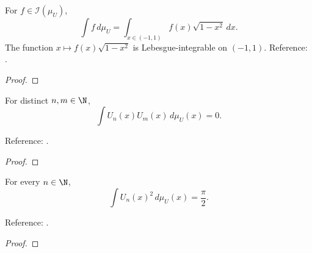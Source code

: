 \begin{lemma}
\label{lem:U-integral}
\leanok
For $f\in\mathcal I(\mu_U)$,
\[\int f\,d\mu_U=\int_{x\in(-1,1)} f(x)\sqrt{1-x^2}\,dx.\]
The function $x\mapsto f(x)\sqrt{1-x^2}$ is Lebesgue-integrable on $(-1,1)$.
Reference: \cite[Table 18.3.1]{dlmf}.
\end{lemma}
\begin{proof}
\leanok
\end{proof}

\begin{theorem}
\label{thm:U-orthogonal}
\leanok
{}
For distinct $n,m\in\N$,
\[\int U_n(x)U_m(x)\,d\mu_U(x)=0.\]

Reference: \cite[Table 18.3.1]{dlmf}.
\end{theorem}
\begin{proof}
\leanok
\end{proof}

\begin{theorem}
\label{thm:U-norm}
\leanok
{}
For every $n\in\N$,
\[\int U_n(x)^2\,d\mu_U(x)=\frac\pi2.\]

Reference: \cite[Table 18.3.1]{dlmf}.
\end{theorem}
\begin{proof}
\leanok
\end{proof}

